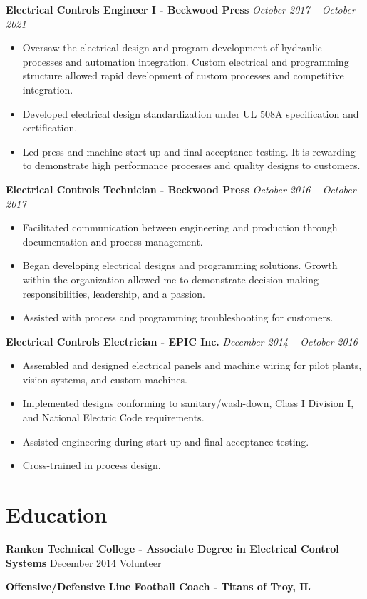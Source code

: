 \documentclass[letterpaper,10pt]{article} %
\newcommand{\job}[3]{
\textbf{#1 - #2} \hfill \textit{#3}
}
\newcommand{\education}[4]{
  \textbf{#1 - #2} \hfill #3
}
\begin{document}
\noindent\job{Electrical Controls Engineer I}{Beckwood Press}{October 2017 – October 2021}
\begin{itemize}[left=2em]
    \item Oversaw the electrical design and program development of hydraulic processes and automation integration. Custom electrical and programming structure allowed rapid development of custom processes and competitive integration.
    \item Developed electrical design standardization under UL 508A specification and certification.
    \item Led press and machine start up and final acceptance testing. It is rewarding to demonstrate high performance processes and quality designs to customers.
\end{itemize}

\noindent\job{Electrical Controls Technician}{Beckwood Press}{October 2016 – October 2017}
\begin{itemize}[left=2em]
    \item Facilitated communication between engineering and production through documentation and process management.
    \item Began developing electrical designs and programming solutions. Growth within the organization allowed me to demonstrate decision making responsibilities, leadership, and a passion.
    \item Assisted with process and programming troubleshooting for customers.
\end{itemize}

\noindent\job{Electrical Controls Electrician}{EPIC Inc.}{December 2014 – October 2016}
\begin{itemize}[left=2em]
    \item Assembled and designed electrical panels and machine wiring for pilot plants, vision systems, and custom machines.
    \item Implemented designs conforming to sanitary/wash-down, Class I Division I, and National Electric Code requirements.
    \item Assisted engineering during start-up and final acceptance testing.
    \item Cross-trained in process design.
\end{itemize}

\section{Education}
\education{Ranken Technical College}{Associate Degree in Electrical Control Systems}{December 2014}

\section{Volunteer}
\job{Offensive/Defensive Line Football Coach}{Titans of Troy, IL}{}
\end{document}
